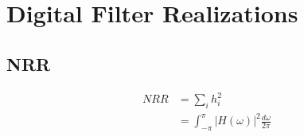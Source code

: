 \section{Digital Filter Realizations}
\subsection{NRR}
\begin{align}
NRR &= \sum_i h_i^2 \\
    &= \int_{-\pi}^{\pi}|H(\omega)|^2 \frac{d\omega}{2\pi}
\end{align}
